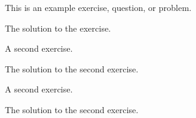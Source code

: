 \begin{exercise}
    This is an example exercise, question, or problem.
\end{exercise}

\begin{solution}
    The solution to the exercise.
\end{solution}


\begin{exercise}
    A second exercise.
\end{exercise}

\begin{solution}
    The solution to the second exercise.
\end{solution}


\begin{exercise}
    A second exercise.
\end{exercise}

\begin{solution}
    The solution to the second exercise.
\end{solution}
